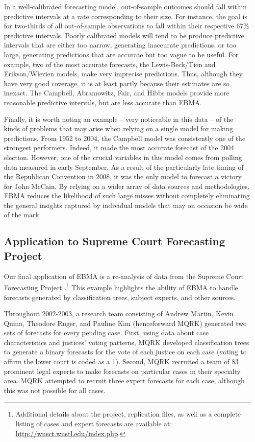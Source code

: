 \documentclass[pdftex,12pt,fullpage,oneside]{amsart}
\begin{document}
 In a well-calibrated forecasting model, out-of-sample outcomes should
 fall within predictive intervals at a rate corresponding to their
 size.  For instance, the goal is for two-thirds of all out-of-sample
 observations to fall within their respective 67\% predictive
 intervals.  Poorly calibrated models will tend to be produce
 predictive intervals that are either too narrow, generating
 inaccurate predictions, or too large, generating predictions that are
 accurate but too vague to be useful. For example, two of the most
 accurate forecasts, the Lewis-Beck/Tien and Erikson/Wlezien models,
 make very imprecise predictions.  Thus, although they have very good
 coverage, it is at least partly because their estimates are so
 inexact.  The Campbell, Abramowitz, Fair, and Hibbs models provide
 more reasonable predictive intervals, but are less accurate than
 EBMA.


 Finally, it is worth noting an example -- very noticeable in this
 data -- of the kinds of problems that may arise when relying on a
 single model for making predictions.  From 1952 to 2004, the Campbell
 model was consistently one of the strongest performers.  Indeed, it
 made the most accurate forecast of the 2004 election.  However, one
 of the crucial variables in this model comes from polling data
 measured in early September.  As a result of the particularly late
 timing of the Republican Convention in 2008, it was the only model to
 forecast a victory for John McCain.  By relying on a wider array of
 data sources and methodologies, EBMA reduces the likelihood of such
 large misses without completely eliminating the general insights
 captured by individual models that may on occasion be wide of the
 mark.

\subsection{Application to Supreme Court Forecasting Project}

Our final application of EBMA is a re-analysis of data from the
Supreme Court Forecasting Project \citep{Ruger:2004,
  Martin:2004}.\footnote{Additional details about the project,
  replication files, as well as a complete listing of cases and expert
  forecasts are available at: \url{http://wusct.wustl.edu/index.php}.}
This example highlights the ability of EBMA to handle forecasts
generated by classification trees, subject experts, and other sources.

Throughout 2002-2003, a research team consisting of Andrew Martin,
Kevin Quinn, Theodore Ruger, and Pauline Kim (henceforward MQRK)
generated two sets of forecasts for every pending case.  First, using
data about case characteristics and justices' voting patterns, MQRK
developed classification trees to generate a binary forecasts for the
vote of each justice on each case (voting to affirm the lower court is
coded as a 1).  Second, MQRK recruited a team of 83 prominent legal
experts to make forecasts on particular cases in their specialty area.
MQRK attempted to recruit three expert forecasts for each case,
although this was not possible for all cases.
\end{document}
